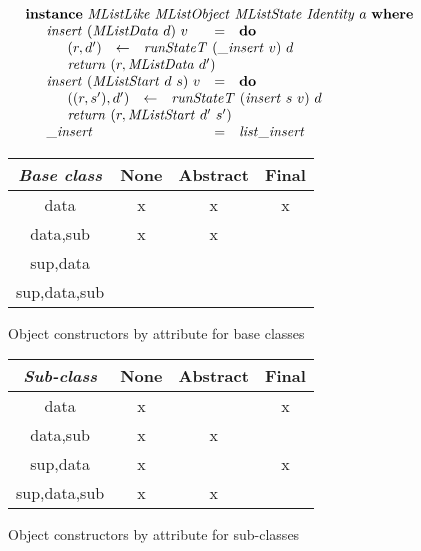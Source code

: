 \documentclass[runningheads,a4paper]{llncs}
\begin{document}
\begin{displaymath}
\begin{array}{l}
\mathbf{instance}~\mathit{MListLike}~\mathit{MListObject}~\mathit{MListState}~\mathit{Identity}~a~\mathbf{where} \\
\quad \begin{array}{lcl}
\mathit{insert}~(\mathit{MListData}~d)~v & = & \mathbf{do} \\
\multicolumn{3}{l}{\quad \begin{array}{lcl}
(r,d') & \leftarrow & \mathit{runStateT}~(\_\mathit{insert}~v)~d \\
\multicolumn{3}{l}{\mathit{return}~(r,\mathit{MListData}~d')}
\end{array}} \\
\mathit{insert}~(\mathit{MListStart}~d~s)~v & = & \mathbf{do} \\
\multicolumn{3}{l}{\quad \begin{array}{lcl}
((r,s'),d') & \leftarrow & \mathit{runStateT}~(\mathit{insert}~s~v)~d \\
\multicolumn{3}{l}{\mathit{return}~(r,\mathit{MListStart}~d'~s')}
\end{array}} \\
\_\mathit{insert} & = & \mathit{list}\_\mathit{insert}
\end{array}
\end{array}
\end{displaymath}


\begin{figure}
\begin{center}
\begin{tabular}{|c|c|c|c|}
\hline \emph{Base class} & None & Abstract & Final \\ 
\hline data         & x & x & x \\ 
\hline data,sub     & x & x &  \\ 
\hline sup,data     &  &  &  \\ 
\hline sup,data,sub &  &  &  \\ 
\hline 
\end{tabular} 
\end{center}
\caption{Object constructors by attribute for base classes}
\label{tab:baseconstructors}
\end{figure}

\begin{figure}
\begin{center}
\begin{tabular}{|c|c|c|c|}
\hline \emph{Sub-class} & None & Abstract & Final \\ 
\hline data         & x &   & x \\ 
\hline data,sub     & x & x &   \\ 
\hline sup,data     & x &   & x \\ 
\hline sup,data,sub & x & x &   \\ 
\hline 
\end{tabular} 
\end{center}
\caption{Object constructors by attribute for sub-classes}
\label{tab:childconstructors}
\end{figure}
\end{document}
